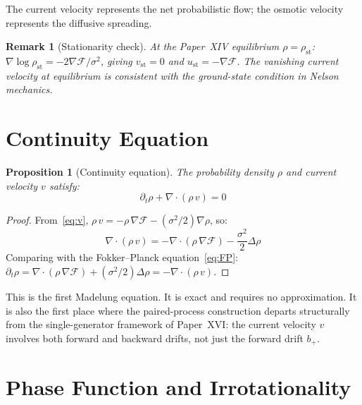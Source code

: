 \documentclass[12pt]{article}
\newtheorem{proposition}[theorem]{Proposition}
\newtheorem{remark}[theorem]{Remark}
\newcommand{\Fcal}{\mathcal{F}}
\begin{document}
The current velocity represents the net probabilistic flow; the osmotic velocity represents the diffusive spreading.

\begin{remark}[Stationarity check]\label{rem:stationary}
At the Paper~XIV equilibrium $\rho = \rho_{\mathrm{st}}$: $\nabla\log\rho_{\mathrm{st}} = -2\nabla\Fcal/\sigma^2$, giving $v_{\mathrm{st}} = 0$ and $u_{\mathrm{st}} = -\nabla\Fcal$. The vanishing current velocity at equilibrium is consistent with the ground-state condition in Nelson mechanics.
\end{remark}

\section{Continuity Equation}\label{sec:continuity}

\begin{proposition}[Continuity equation]\label{prop:continuity}
The probability density $\rho$ and current velocity $v$ satisfy:
\begin{equation}\label{eq:continuity}
    \partial_t\rho + \nabla\cdot(\rho\, v) = 0
\end{equation}
\end{proposition}

\begin{proof}
From~\eqref{eq:v}, $\rho\, v = -\rho\,\nabla\Fcal - (\sigma^2/2)\nabla\rho$, so:
\begin{equation}
    \nabla\cdot(\rho\, v) = -\nabla\cdot(\rho\,\nabla\Fcal) - \frac{\sigma^2}{2}\Delta\rho
\end{equation}
Comparing with the Fokker--Planck equation~\eqref{eq:FP}: $\partial_t\rho = \nabla\cdot(\rho\,\nabla\Fcal) + (\sigma^2/2)\Delta\rho = -\nabla\cdot(\rho\,v)$.
\end{proof}

This is the first Madelung equation. It is exact and requires no approximation. It is also the first place where the paired-process construction departs structurally from the single-generator framework of Paper~XVI: the current velocity $v$ involves both forward and backward drifts, not just the forward drift $b_+$.

\section{Phase Function and Irrotationality}\label{sec:phase}
\end{document}
